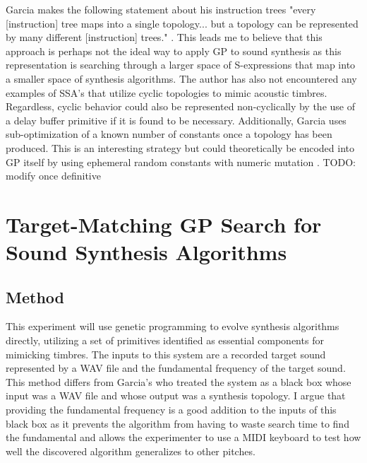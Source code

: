 \documentclass[12pt]{article}
\begin{document}
Garcia makes the following statement about his instruction trees "every [instruction] tree maps into a single topology... but a topology can be represented by many different [instruction] trees." \citep{garcia2012automatic}. This leads me to believe that this approach is perhaps not the ideal way to apply GP to sound synthesis as this representation is searching through a larger space of S-expressions that map into a smaller space of synthesis algorithms. The author has also not encountered any examples of SSA's that utilize cyclic topologies to mimic acoustic timbres. Regardless, cyclic behavior could also be represented non-cyclically by the use of a delay buffer primitive if it is found to be necessary. Additionally, Garcia uses sub-optimization of a known number of constants once a topology has been produced. This is an interesting strategy but could theoretically be encoded into GP itself by using ephemeral random constants with numeric mutation \citep{evett1998numeric}. TODO: modify once definitive

\section{Target-Matching GP Search for Sound Synthesis Algorithms}
\subsection{Method}
This experiment will use genetic programming to evolve synthesis algorithms directly, utilizing a set of primitives identified as essential components for mimicking timbres. The inputs to this system are a recorded target sound represented by a WAV file and the fundamental frequency of the target sound. This method differs from Garcia's who treated the system as a black box whose input was a WAV file and whose output was a synthesis topology. I argue that providing the fundamental frequency is a good addition to the inputs of this black box as it prevents the algorithm from having to waste search time to find the fundamental and allows the experimenter to use a MIDI keyboard to test how well the discovered algorithm generalizes to other pitches.
\end{document}
